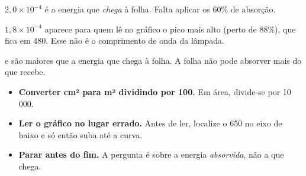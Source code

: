 
\begin{outras}
 $2{,}0 \times 10^{-4}$ é a energia que \emph{chega} à folha. Falta aplicar os 60\% de absorção.\par
{} $1{,}8 \times 10^{-4}$ aparece para quem lê no gráfico o pico mais alto (perto de 88\%), que fica em 480. Esse não é o comprimento de onda da lâmpada.\par
{} e  são maiores que a energia que chega à folha. A folha não pode absorver mais do que recebe.
\end{outras}

\begin{pegadinha}
\begin{itemize}
  \item \textbf{Converter cm² para m² dividindo por 100.} Em área, divide-se por 10\,000.
  \item \textbf{Ler o gráfico no lugar errado.} Antes de ler, localize o 650 no eixo de baixo e só então suba até a curva.
  \item \textbf{Parar antes do fim.} A pergunta é sobre a energia \emph{absorvida}, não a que chega.
\end{itemize}
\end{pegadinha}
